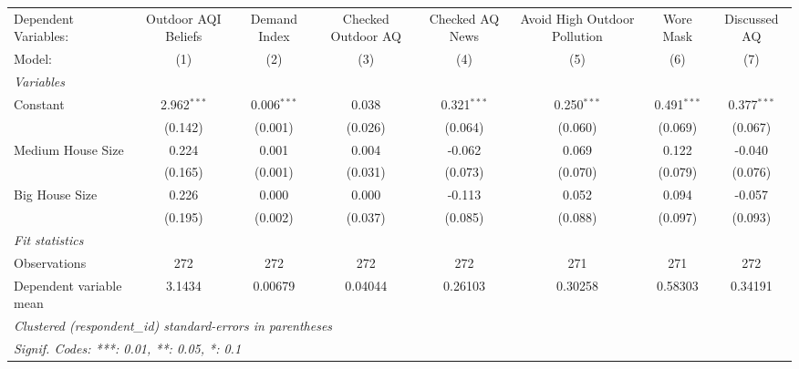 
\begingroup
\centering
\begin{tabular}{lccccccc}
   \tabularnewline \midrule \midrule
   Dependent Variables:    & Outdoor AQI Beliefs & Demand Index  & Checked Outdoor AQ & Checked AQ News & Avoid High Outdoor Pollution & Wore Mask     & Discussed AQ\\  
   Model:                  & (1)                 & (2)           & (3)                & (4)             & (5)                          & (6)           & (7)\\  
   \midrule
   \emph{Variables}\\
   Constant                & 2.962$^{***}$       & 0.006$^{***}$ & 0.038              & 0.321$^{***}$   & 0.250$^{***}$                & 0.491$^{***}$ & 0.377$^{***}$\\   
                           & (0.142)             & (0.001)       & (0.026)            & (0.064)         & (0.060)                      & (0.069)       & (0.067)\\   
   Medium House Size       & 0.224               & 0.001         & 0.004              & -0.062          & 0.069                        & 0.122         & -0.040\\   
                           & (0.165)             & (0.001)       & (0.031)            & (0.073)         & (0.070)                      & (0.079)       & (0.076)\\   
   Big House Size          & 0.226               & 0.000         & 0.000              & -0.113          & 0.052                        & 0.094         & -0.057\\   
                           & (0.195)             & (0.002)       & (0.037)            & (0.085)         & (0.088)                      & (0.097)       & (0.093)\\   
   \midrule
   \emph{Fit statistics}\\
   Observations            & 272                 & 272           & 272                & 272             & 271                          & 271           & 272\\  
   Dependent variable mean & 3.1434              & 0.00679       & 0.04044            & 0.26103         & 0.30258                      & 0.58303       & 0.34191\\  
   \midrule \midrule
   \multicolumn{8}{l}{\emph{Clustered (respondent\_id) standard-errors in parentheses}}\\
   \multicolumn{8}{l}{\emph{Signif. Codes: ***: 0.01, **: 0.05, *: 0.1}}\\
\end{tabular}
\par\endgroup


